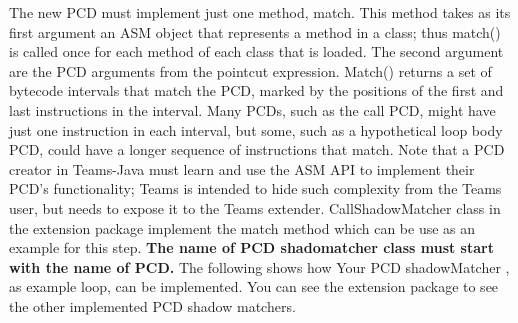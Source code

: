 \documentclass{report}
\begin{document}
The new PCD must implement just one method, match. This method takes as its first argument an ASM object that represents a method in a class; thus match() is called once for each method of each class that is loaded. The second argument are the PCD arguments from the pointcut expression. Match() returns a set of bytecode intervals that match the PCD, marked by the positions of the first and last instructions in the interval. Many PCDs, such as the call PCD, might have just one instruction in each interval, but some, such as a hypothetical loop body PCD, could have a longer sequence of instructions that match. Note that a PCD creator in Teams-Java must learn and use the ASM API to implement their PCD's functionality; Teams is intended to hide such complexity from the Teams user, but needs to expose it to the Teams extender. 
CallShadowMatcher class in the extension package implement the match method which can be use as an example for this step. {\bf The name of PCD shadomatcher class must start with the name of PCD.}
The following shows how Your PCD shadowMatcher , as example loop, can be implemented. You can see the extension package to see the other implemented PCD shadow matchers. 
\end{document}
